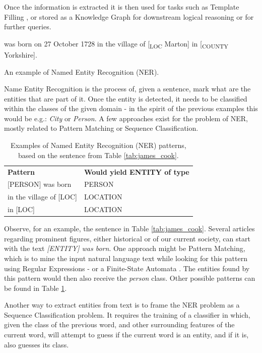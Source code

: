 \documentclass[11pt,a4paper,openright]{memoir}
\begin{document}
Once the information is extracted it is then used for tasks such as Template Filling \cite{Jurafsky:2000:SLP:555733}, or stored as a Knowledge Graph for downstream logical reasoning or for further queries.

\begin{table}[!htbp]
  \centering
   was born on 27 October 1728 in the village of [\textsubscript{LOC} Marton] in [\textsubscript{COUNTY} Yorkshire].
  \caption[An example of NER.]{An example of Named Entity Recognition (NER).}
  \label{tab:james_cook}
\end{table}

Name Entity Recognition is the process of, given a sentence, mark what are the entities that are part of it. Once the entity is detected, it needs to be classified within the classes of the given domain - in the spirit of the previous examples this would be e.g.: \emph{City} or \emph{Person}. A few approaches exist for the problem of NER, mostly related to Pattern Matching or Sequence Classification.

\begin{table}[!htbp]
  \centering
    \begin{tabular}{ll}
      \textbf{Pattern}          & \textbf{Would yield ENTITY of type} \\
      {[PERSON]} was born       & PERSON            \\
      in the village of {[LOC]} & LOCATION          \\
      in {[LOC]}                & LOCATION           
    \end{tabular}
  \caption[Patterns for NER.]{Examples of Named Entity Recognition (NER) patterns, based on the sentence from Table \ref{tab:james_cook}.}
  \label{tab:james_cook_patterns}
\end{table}

Observe, for an example, the sentence in Table \ref{tab:james_cook}. Several articles regarding prominent figures, either historical or of our current society, can start with the text \emph{[ENTITY] was born}. One approach might be Pattern Matching, which is to mine the input natural language text while looking for this pattern using Regular Expressions - or a Finite-State Automata \cite{Jurafsky:2000:SLP:555733}. The entities found by this pattern would then also receive the \emph{person} class. Other possible patterns can be found in Table \ref{tab:james_cook_patterns}.

Another way to extract entities from text is to frame the NER problem as a Sequence Classification problem. It requires the training of a classifier in which, given the class of the previous word, and other surrounding features of the current word, will attempt to guess if the current word is an entity, and if it is, also guesses its class.
\end{document}
